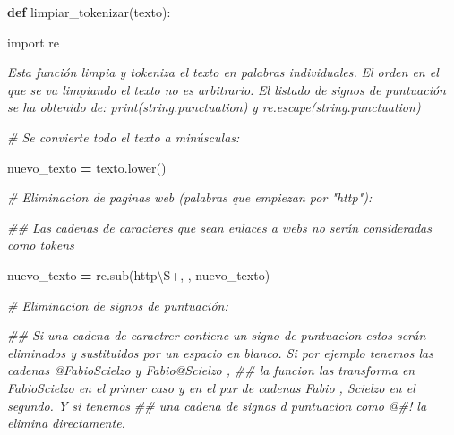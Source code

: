 \documentclass[
  11pt,
  a4paper,
]{article}
\newenvironment{Shaded}{\begin{snugshade}}{\end{snugshade}}
\newcommand{\CommentTok}[1]{\textcolor[rgb]{0.56,0.35,0.01}{\textit{#1}}}
\newcommand{\ImportTok}[1]{#1}
\newcommand{\KeywordTok}[1]{\textcolor[rgb]{0.13,0.29,0.53}{\textbf{#1}}}
\newcommand{\NormalTok}[1]{#1}
\newcommand{\OperatorTok}[1]{\textcolor[rgb]{0.81,0.36,0.00}{\textbf{#1}}}
\newcommand{\StringTok}[1]{\textcolor[rgb]{0.31,0.60,0.02}{#1}}
\begin{document}
\begin{Shaded}
\begin{Highlighting}[]
\KeywordTok{def}\NormalTok{ limpiar\_tokenizar(texto):}

    \ImportTok{import}\NormalTok{ re}
    
    \CommentTok{\textquotesingle{}\textquotesingle{}\textquotesingle{}}
\CommentTok{    Esta función limpia y tokeniza el texto en palabras individuales.}
\CommentTok{    El orden en el que se va limpiando el texto no es arbitrario.}
\CommentTok{    El listado de signos de puntuación se ha obtenido de: print(string.punctuation)}
\CommentTok{    y re.escape(string.punctuation)}
\CommentTok{    \textquotesingle{}\textquotesingle{}\textquotesingle{}}
    
    \CommentTok{\# Se convierte todo el texto a minúsculas:}

\NormalTok{    nuevo\_texto }\OperatorTok{=}\NormalTok{ texto.lower()}
    
    
    \CommentTok{\# Eliminacion de paginas web (palabras que empiezan por "http"):}
    
    \CommentTok{\#\# Las cadenas de caracteres que sean enlaces a webs no serán consideradas como tokens}
    
\NormalTok{    nuevo\_texto }\OperatorTok{=}\NormalTok{ re.sub(}\StringTok{\textquotesingle{}http\textbackslash{}S+\textquotesingle{}}\NormalTok{, }\StringTok{\textquotesingle{} \textquotesingle{}}\NormalTok{, nuevo\_texto)}
    
    
    \CommentTok{\# Eliminacion de signos de puntuación:}
    
    \CommentTok{\#\# Si una cadena de caractrer contiene un signo de puntuacion estos serán eliminados y sustituidos por un   espacio en blanco. Si  por ejemplo tenemos las cadenas  \textquotesingle{}@FabioScielzo\textquotesingle{} y \textquotesingle{}Fabio@Scielzo\textquotesingle{} ,}
    \CommentTok{\#\# la funcion las transforma en  \textquotesingle{}FabioScielzo\textquotesingle{} en el primer caso  y en el par de cadenas \textquotesingle{}Fabio\textquotesingle{} , \textquotesingle{}Scielzo\textquotesingle{} en el segundo. Y si tenemos}
    \CommentTok{\#\# una cadena de signos d puntuacion   como \textquotesingle{}@\#!\textquotesingle{} la elimina directamente.}
    

\end{Highlighting}
\end{Shaded}
\end{document}

